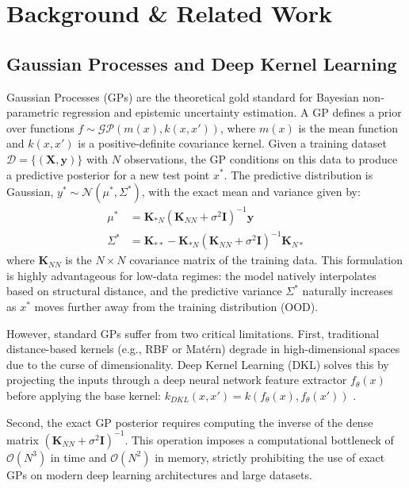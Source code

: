\section{Background \& Related Work}

\subsection{Gaussian Processes and Deep Kernel Learning}
Gaussian Processes (GPs) are the theoretical gold standard for Bayesian non-parametric regression and epistemic uncertainty estimation. A GP defines a prior over functions $f \sim \mathcal{GP}(m(x), k(x, x'))$, where $m(x)$ is the mean function and $k(x, x')$ is a positive-definite covariance kernel. Given a training dataset $\mathcal{D} = \{(\mathbf{X}, \mathbf{y})\}$ with $N$ observations, the GP conditions on this data to produce a predictive posterior for a new test point $x^*$. The predictive distribution is Gaussian, $y^* \sim \mathcal{N}(\mu^*, \Sigma^*)$, with the exact mean and variance given by:
\begin{align}
    \mu^* &= \mathbf{K}_{*N} (\mathbf{K}_{NN} + \sigma^2 \mathbf{I})^{-1} \mathbf{y} \\
    \Sigma^* &= \mathbf{K}_{**} - \mathbf{K}_{*N} (\mathbf{K}_{NN} + \sigma^2 \mathbf{I})^{-1} \mathbf{K}_{N*}
\end{align}
where $\mathbf{K}_{NN}$ is the $N \times N$ covariance matrix of the training data. This formulation is highly advantageous for low-data regimes: the model natively interpolates based on structural distance, and the predictive variance $\Sigma^*$ naturally increases as $x^*$ moves further away from the training distribution (OOD).

However, standard GPs suffer from two critical limitations. First, traditional distance-based kernels (e.g., RBF or Matérn) degrade in high-dimensional spaces due to the curse of dimensionality. Deep Kernel Learning (DKL) solves this by projecting the inputs through a deep neural network feature extractor $f_\theta(x)$ before applying the base kernel: $k_{DKL}(x, x') = k(f_\theta(x), f_\theta(x'))$ \cite{wilson2016deep}. 

Second, the exact GP posterior requires computing the inverse of the dense matrix $(\mathbf{K}_{NN} + \sigma^2 \mathbf{I})^{-1}$. This operation imposes a computational bottleneck of $\mathcal{O}(N^3)$ in time and $\mathcal{O}(N^2)$ in memory, strictly prohibiting the use of exact GPs on modern deep learning architectures and large datasets.

